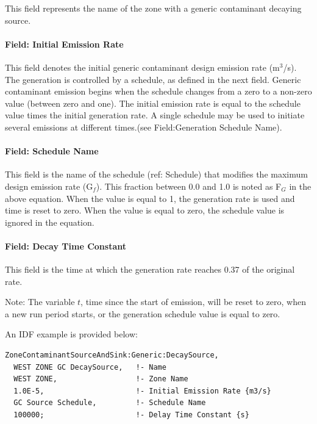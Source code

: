 This field represents the name of the zone with a generic contaminant decaying source.

\paragraph{Field: Initial Emission Rate}\label{field-initial-emission-rate}

This field denotes the initial generic contaminant design emission rate (m\(^{3}\)/s). The generation is controlled by a schedule, as defined in the next field. Generic contaminant emission begins when the schedule changes from a zero to a non-zero value (between zero and one). The initial emission rate is equal to the schedule value times the initial generation rate. A single schedule may be used to initiate several emissions at different times.(see Field:Generation Schedule Name).

\paragraph{Field: Schedule Name}\label{field-schedule-name-7}

This field is the name of the schedule (ref: Schedule) that modifies the maximum design emission rate (G\(_{f}\)). This fraction between 0.0 and 1.0 is noted as F\(_{G}\) in the above equation. When the value is equal to 1, the generation rate is used and time is reset to zero. When the value is equal to zero, the schedule value is ignored in the equation.

\paragraph{Field: Decay Time Constant}\label{field-decay-time-constant}

This field is the time at which the generation rate reaches 0.37 of the original rate.

\begin{callout}
  Note: The variable \(t\), time since the start of emission, will be reset to zero, when a new run period starts, or the generation schedule value is equal to zero.
\end{callout}

An IDF example is provided below:

\begin{lstlisting}
ZoneContaminantSourceAndSink:Generic:DecaySource,
  WEST ZONE GC DecaySource,   !- Name
  WEST ZONE,                  !- Zone Name
  1.0E-5,                     !- Initial Emission Rate {m3/s}
  GC Source Schedule,         !- Schedule Name
  100000;                     !- Delay Time Constant {s}
\end{lstlisting}

